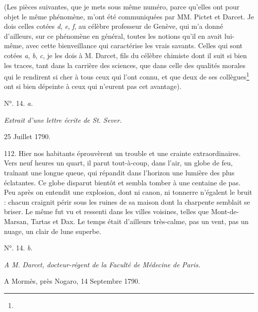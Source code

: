 \documentclass[a4paper, 11pt, oneside, polutonikogreek, french]{article}
\begin{document}
(Les pièces suivantes, que je mets sous même numéro, parce qu'elles ont pour objet le même phénomène, m'ont été communiquées par MM. Pictet et Darcet. Je dois celles cotées \emph{d}, \emph{e}, \emph{f}, au célèbre professeur de Genève, qui m'a donné d'ailleurs, sur ce phénomène en général, toutes les notions qu'il en avait lui-même, avec cette bienveillance qui caractérise les vrais savants. Celles qui sont cotées \emph{a}, \emph{b}, \emph{c}, je les dois à M. Darcet, fils du célèbre chimiste dont il suit si bien les traces, tant dans la carrière des sciences, que dans celle des qualités morales qui le rendirent si cher à tous ceux qui l'ont connu, et que deux de ses collègues\footnote{} ont si bien dépeinte à ceux qui n'eurent pas cet avantage).

\begin{center}
N°. 14. \emph{a.}
\end{center}

\begin{center}
\emph{Extrait d'une lettre écrite de St. Sever.}
\end{center}

25 Juillet 1790.

112. \og Hier nos habitants éprouvèrent un trouble et une crainte extraordinaires. Vers neuf heures un quart, il parut tout-à-coup, dans l'air, un globe de feu, traînant une longue queue, qui répandit dans l'horizon une lumière des plus éclatantes. Ce globe disparut bientôt et sembla tomber à une centaine de pas. Peu après on entendit une explosion, dont ni canon, ni tonnerre n'égalent le bruit : chacun craignit périr sous les ruines de sa maison dont la charpente semblait se briser. Le même fut vu et ressenti dans les villes voisines, telles que Mont-de-Marsan, Tartas et Dax. Le temps était d'ailleurs très-calme, pas un vent, pas un nuage, un clair de lune superbe. \fg

\begin{center}
N°. 14. \emph{b.}
\end{center}

\begin{center}
\emph{A M. Darcet, docteur-régent de la Faculté de Médecine de Paris.}
\end{center}

A Mormès, près Nogaro, 14 Septembre 1790.
\end{document}
